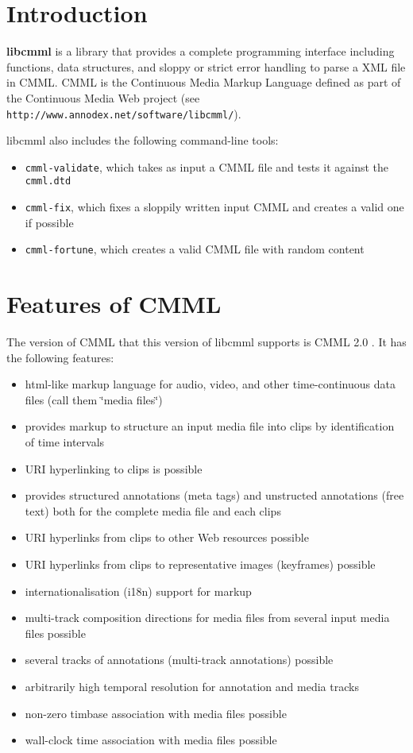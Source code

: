 \section{Introduction}\label{intro}
{\bf libcmml} is a library that provides a complete programming interface including functions, data structures, and sloppy or strict error handling to parse a XML file in CMML. CMML is the Continuous Media Markup Language defined as part of the Continuous Media Web project (see {\tt http://www.annodex.net/software/libcmml/}).

libcmml also includes the following command-line tools:\begin{itemize}
\item {\tt cmml-validate}, which takes as input a CMML file and tests it against the {\tt cmml.dtd}\item {\tt cmml-fix}, which fixes a sloppily written input CMML and creates a valid one if possible\item {\tt cmml-fortune}, which creates a valid CMML file with random content\end{itemize}
\section{Features of CMML}\label{features}
The version of CMML that this version of libcmml supports is CMML 2.0 . It has the following features:

\begin{itemize}
\item html-like markup language for audio, video, and other time-continuous data files (call them \char`\"{}media files\char`\"{})\item provides markup to structure an input media file into clips by identification of time intervals\item URI hyperlinking to clips is possible\item provides structured annotations (meta tags) and unstructed annotations (free text) both for the complete media file and each clips\item URI hyperlinks from clips to other Web resources possible\item URI hyperlinks from clips to representative images (keyframes) possible\item internationalisation (i18n) support for markup\item multi-track composition directions for media files from several input media files possible\item several tracks of annotations (multi-track annotations) possible\item arbitrarily high temporal resolution for annotation and media tracks\item non-zero timbase association with media files possible\item wall-clock time association with media files possible\end{itemize}



